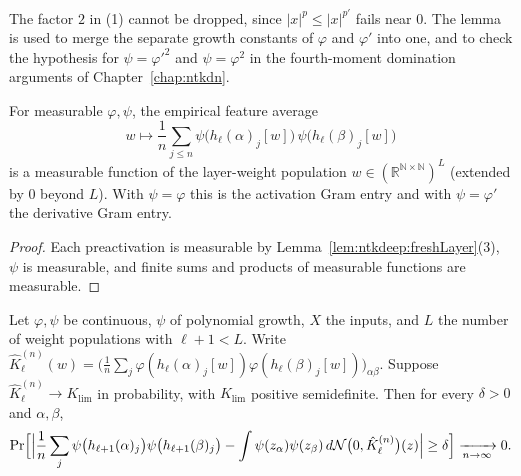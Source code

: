 The factor $2$ in (1) cannot be dropped, since $|x|^p\le|x|^{p'}$ fails near $0$. The lemma is used to merge the separate growth constants of $\varphi$ and $\varphi'$ into one, and to check the hypothesis for $\psi=\varphi'^2$ and $\psi=\varphi^2$ in the fourth-moment domination arguments of Chapter~\ref{chap:ntkdn}.

\begin{lemma}\label{lem:ntkcond:featureAverageMeasurable}
  \leanok
For measurable $\varphi,\psi$, the empirical feature average
\[
  w\longmapsto\frac1n\sum_{j\le n}\psi\bigl(h_\ell(\alpha)_j[w]\bigr)\,\psi\bigl(h_\ell(\beta)_j[w]\bigr)
\]
is a measurable function of the layer-weight population $w\in(\mathbb R^{\mathbb N\times\mathbb N})^L$ (extended by $0$ beyond $L$). With $\psi=\varphi$ this is the activation Gram entry and with $\psi=\varphi'$ the derivative Gram entry.
\end{lemma}

\begin{proof}
  \leanok
Each preactivation is measurable by Lemma~\ref{lem:ntkdeep:freshLayer}(3), $\psi$ is measurable, and finite sums and products of measurable functions are measurable.
\end{proof}

\begin{theorem}\label{thm:ntkcond:successorDeviation}
  \leanok
Let $\varphi,\psi$ be continuous, $\psi$ of polynomial growth, $X$ the inputs, and $L$ the number of weight populations with $\ell+1<L$. Write $\hat K^{(n)}_\ell(w)=\bigl(\frac1n\sum_j\varphi(h_\ell(\alpha)_j[w])\varphi(h_\ell(\beta)_j[w])\bigr)_{\alpha\beta}$. Suppose $\hat K^{(n)}_\ell\to K_{\lim}$ in probability, with $K_{\lim}$ positive semidefinite. Then for every $\delta>0$ and $\alpha,\beta$,
\[
  \Pr\Bigl[\Bigl|\frac1n\sum_j\psi\bigl(h_{\ell+1}(\alpha)_j\bigr)\psi\bigl(h_{\ell+1}(\beta)_j\bigr)-\int\psi(z_\alpha)\psi(z_\beta)\,d\mathcal N\bigl(0,\hat K^{(n)}_\ell\bigr)(z)\Bigr|\ge\delta\Bigr]\xrightarrow[n\to\infty]{}0 .
\]
\end{theorem}

